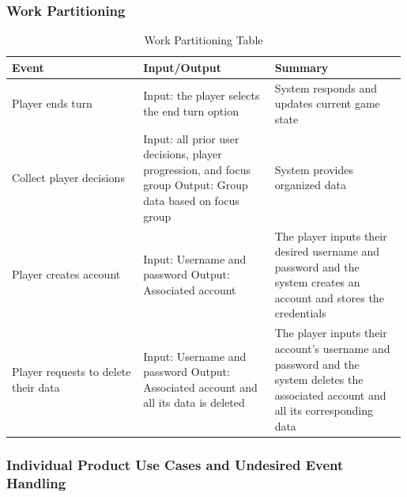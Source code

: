 \documentclass{article}
\begin{document}
\subsubsection{Work Partitioning}
\begin{table}[H]
    \centering
    \begin{tabular}{|p{0.33\linewidth} | p{0.33\linewidth} | p{0.33\linewidth}| }
    \hline
         Event & Input/Output & Summary \\
         \hline
         Player ends turn & Input: the player selects the end turn option & System responds and updates current game state\\
         \hline 
         Collect player decisions & Input: all prior user decisions, player progression, and focus group \newline Output: Group data based on focus group  & System provides organized data \\
         \hline 
          Player creates account & Input: Username and password \newline Output: Associated account & The player inputs their desired username and password and the system creates an account and stores the credentials\\
         \hline 
         Player requests to delete their data & Input: Username and password \newline Output: Associated account and all its data is deleted & The player inputs their account's username and password and the system deletes the associated account and all its corresponding data\\
         \hline 
    \end{tabular}
    \caption{Work Partitioning Table}
    \label{tab:my_label}
\end{table}

\subsubsection{Individual Product Use Cases and Undesired Event Handling}
\end{document}
